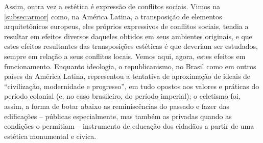 Assim, outra vez a estética é expressão de conflitos sociais. Vimos na \autoref{subsec:armor} como, na América Latina, a transposição de elementos arquitetônicos europeus, eles próprios expressivos de conflitos sociais, tendia a resultar em efeitos diversos daqueles obtidos em seus ambientes originais, e que estes efeitos resultantes das transposições estéticas é que deveriam ser estudados, sempre em relação a seus conflitos locais. Vemos aqui, agora, estes efeitos em funcionamento. Enquanto ideologia, o republicanismo, no Brasil como em outros países da América Latina, representou a tentativa de aproximação de ideais de ``civilização, modernidade e progresso'', em tudo opostos aos valores e práticas do período colonial (e, no caso brasileiro, do período imperial); o ecletismo foi, assim, a forma de botar abaixo as reminiscências do passado e fazer das edificações -- públicas especialmente, mas também as privadas quando as condições o permitiam -- instrumento de educação dos cidadãos a partir de uma estética monumental e cívica.